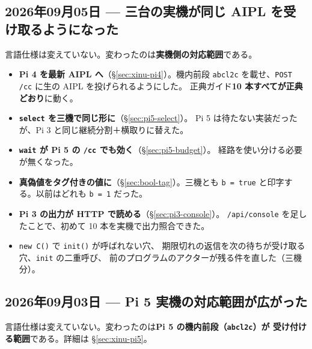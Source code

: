 \documentclass[11pt,a4paper]{ltjsarticle}
\begin{document}
\subsection{2026年09月05日 --- 三台の実機が同じ AIPL を受け取るようになった}

言語仕様は変えていない。変わったのは\textbf{実機側の対応範囲}である。

\begin{itemize}
\item \textbf{Pi 4 を最新 AIPL へ}（\S\ref{sec:xinu-pi4}）。機内前段
  \texttt{abcl2c} を載せ、\texttt{POST /cc} に生の AIPL を投げられるようにした。
  正典ガイド\textbf{10 本すべてが正典どおり}に動く。
\item \textbf{\texttt{select} を三機で同じ形に}（\S\ref{sec:pi5-select}）。
  Pi 5 は待たない実装だったが、Pi 3 と同じ継続分割＋横取りに替えた。
\item \textbf{\texttt{wait} が Pi 5 の \texttt{/cc} でも効く}（\S\ref{sec:pi5-budget}）。
  経路を使い分ける必要が無くなった。
\item \textbf{真偽値をタグ付きの値に}（\S\ref{sec:bool-tag}）。三機とも
  \texttt{b = true} と印字する。以前はどれも \texttt{b = 1} だった。
\item \textbf{Pi 3 の出力が HTTP で読める}（\S\ref{sec:pi3-console}）。
  \texttt{/api/console} を足したことで、初めて 10 本を実機で出力照合できた。
\item \texttt{new C()} で \texttt{init()} が呼ばれない穴、
  期限切れの返信を次の待ちが受け取る穴、\texttt{init} の二重呼び、
  前のプログラムのアクターが残る件を直した（三機分）。
\end{itemize}

\subsection{2026年09月03日 --- Pi 5 実機の対応範囲が広がった}

言語仕様は変えていない。変わったのは\textbf{Pi 5 の機内前段（\texttt{abcl2c}）が
受け付ける範囲}である。詳細は \S\ref{sec:xinu-pi5}。
\end{document}

